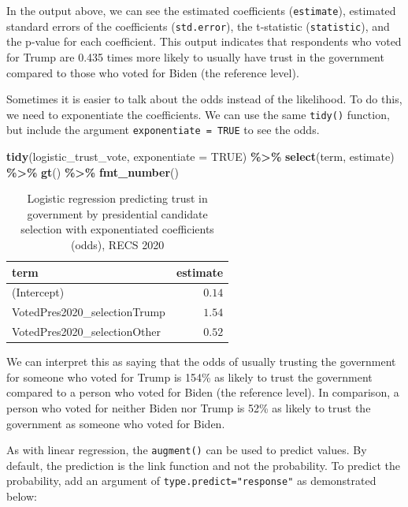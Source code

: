 \documentclass[
]{krantz}
\makeatletter
\newenvironment{Shaded}{\begin{snugshade}}{\end{snugshade}}
\newcommand{\AttributeTok}[1]{\textcolor[rgb]{0.27,0.27,0.27}{#1}}
\newcommand{\ConstantTok}[1]{\textcolor[rgb]{0.37,0.37,0.37}{#1}}
\newcommand{\FunctionTok}[1]{\textcolor[rgb]{0.27,0.27,0.27}{\textbf{#1}}}
\newcommand{\NormalTok}[1]{#1}
\newcommand{\SpecialCharTok}[1]{\textcolor[rgb]{0.43,0.43,0.43}{\textbf{#1}}}
\newenvironment{kframe}{%
\medskip{}
\setlength{\fboxsep}{.8em}
 \def\at@end@of@kframe{}%
 \ifinner\ifhmode%
  \def\at@end@of@kframe{\end{minipage}}%
  \begin{minipage}{\columnwidth}%
 \fi\fi%
 \def\FrameCommand##1{\hskip\@totalleftmargin \hskip-\fboxsep
 \colorbox{shadecolor}{##1}\hskip-\fboxsep
     \hskip-\linewidth \hskip-\@totalleftmargin \hskip\columnwidth}%
 \MakeFramed {\advance\hsize-\width
   \@totalleftmargin\z@ \linewidth\hsize
   \@setminipage}}%
 {\par\unskip\endMakeFramed%
 \at@end@of@kframe}
\renewenvironment{Shaded}{\begin{kframe}}{\end{kframe}}
\makeatother
\begin{document}
In the output above, we can see the estimated coefficients (\texttt{estimate}), estimated standard errors of the coefficients (\texttt{std.error}), the t-statistic (\texttt{statistic}), and the p-value for each coefficient. This output indicates that respondents who voted for Trump are 0.435 times more likely to usually have trust in the government compared to those who voted for Biden (the reference level).

Sometimes it is easier to talk about the odds instead of the likelihood. To do this, we need to exponentiate the coefficients. We can use the same \texttt{tidy()} function, but include the argument \texttt{exponentiate\ =\ TRUE} to see the odds.

\begin{Shaded}
\begin{Highlighting}[]
\FunctionTok{tidy}\NormalTok{(logistic\_trust\_vote, }\AttributeTok{exponentiate =} \ConstantTok{TRUE}\NormalTok{) }\SpecialCharTok{\%\textgreater{}\%}
  \FunctionTok{select}\NormalTok{(term, estimate) }\SpecialCharTok{\%\textgreater{}\%}
  \FunctionTok{gt}\NormalTok{() }\SpecialCharTok{\%\textgreater{}\%}
  \FunctionTok{fmt\_number}\NormalTok{()}
\end{Highlighting}
\end{Shaded}



\begin{longtable}{lr}
\caption{\label{tab:model-logisticexamp-model-odds-tab}Logistic regression predicting trust in government by presidential candidate selection with exponentiated coefficients (odds), RECS 2020}\\
\toprule
term & estimate \\ 
\midrule\relax
(Intercept) & $0.14$ \\ 
VotedPres2020\_selectionTrump & $1.54$ \\ 
VotedPres2020\_selectionOther & $0.52$ \\ 
\bottomrule
\end{longtable}

We can interpret this as saying that the odds of usually trusting the government for someone who voted for Trump is 154\% as likely to trust the government compared to a person who voted for Biden (the reference level). In comparison, a person who voted for neither Biden nor Trump is 52\% as likely to trust the government as someone who voted for Biden.

As with linear regression, the \texttt{augment()} can be used to predict values. By default, the prediction is the link function and not the probability. To predict the probability, add an argument of \texttt{type.predict="response"} as demonstrated below:
\end{document}
